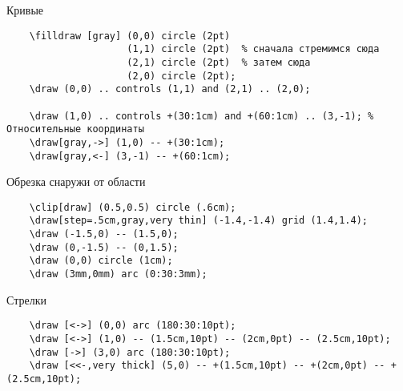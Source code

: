 \documentclass[a4paper,12pt]{article}
\begin{document}
Кривые
\begin{verbatim}
    \filldraw [gray] (0,0) circle (2pt)
                     (1,1) circle (2pt)  % сначала стремимся сюда
                     (2,1) circle (2pt)  % затем сюда
                     (2,0) circle (2pt);
    \draw (0,0) .. controls (1,1) and (2,1) .. (2,0);

    \draw (1,0) .. controls +(30:1cm) and +(60:1cm) .. (3,-1); % Относительные координаты
    \draw[gray,->] (1,0) -- +(30:1cm);
    \draw[gray,<-] (3,-1) -- +(60:1cm);
\end{verbatim}

Обрезка снаружи от области
\begin{verbatim}
    \clip[draw] (0.5,0.5) circle (.6cm);
    \draw[step=.5cm,gray,very thin] (-1.4,-1.4) grid (1.4,1.4);
    \draw (-1.5,0) -- (1.5,0);
    \draw (0,-1.5) -- (0,1.5);
    \draw (0,0) circle (1cm);
    \draw (3mm,0mm) arc (0:30:3mm);
\end{verbatim}

Стрелки
\begin{verbatim}
    \draw [<->] (0,0) arc (180:30:10pt);
    \draw [<->] (1,0) -- (1.5cm,10pt) -- (2cm,0pt) -- (2.5cm,10pt);
    \draw [->] (3,0) arc (180:30:10pt);
    \draw [<<-,very thick] (5,0) -- +(1.5cm,10pt) -- +(2cm,0pt) -- +(2.5cm,10pt);
\end{verbatim}
\end{document}
